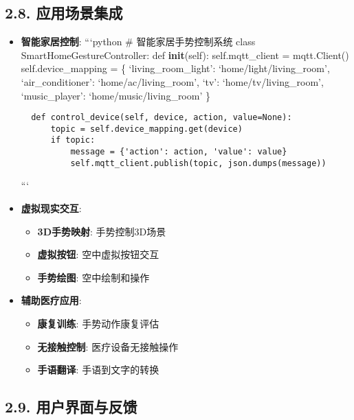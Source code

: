 \subsection{2.8.
应用场景集成}\label{ux5e94ux7528ux573aux666fux96c6ux6210}

\begin{itemize}
\item
  \textbf{智能家居控制}: ```python \# 智能家居手势控制系统 class
  SmartHomeGestureController: def \textbf{init}(self): self.mqtt\_client
  = mqtt.Client() self.device\_mapping = \{ `living\_room\_light':
  `home/light/living\_room', `air\_conditioner': `home/ac/living\_room',
  `tv': `home/tv/living\_room', `music\_player':
  `home/music/living\_room' \}

\begin{lstlisting}
  def control_device(self, device, action, value=None):
      topic = self.device_mapping.get(device)
      if topic:
          message = {'action': action, 'value': value}
          self.mqtt_client.publish(topic, json.dumps(message))
\end{lstlisting}

  ```
\item
  \textbf{虚拟现实交互}:

  \begin{itemize}
  \tightlist
  \item
    \textbf{3D手势映射}: 手势控制3D场景
  \item
    \textbf{虚拟按钮}: 空中虚拟按钮交互
  \item
    \textbf{手势绘图}: 空中绘制和操作
  \end{itemize}
\item
  \textbf{辅助医疗应用}:

  \begin{itemize}
  \tightlist
  \item
    \textbf{康复训练}: 手势动作康复评估
  \item
    \textbf{无接触控制}: 医疗设备无接触操作
  \item
    \textbf{手语翻译}: 手语到文字的转换
  \end{itemize}
\end{itemize}

\subsection{2.9.
用户界面与反馈}\label{ux7528ux6237ux754cux9762ux4e0eux53cdux9988}

